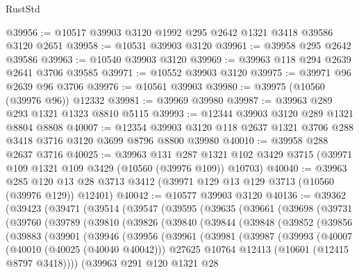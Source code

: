 \begin{lexlean}{RustStd}
\begin{coremodule}
@39956 := @10517 @39903 @3120 @1992 @295 @2642 @1321 @3418 @39586 @3120 @2651
@39958 := @10531 @39903 @3120
@39961 := @39958 @295 @2642 @39586
@39963 := @10540 @39903 @3120
@39969 := @39963 @118 @294 @2639 @2641 @3706 @39585
@39971 := @10552 @39903 @3120
@39975 := @39971 @96 @2639 @96 @3706
@39976 := @10561 @39903
@39980 := @39975 (@10560 (@39976 @96)) @12332
@39981 := @39969 @39980
@39987 := @39963 @289 @293 @1321 @1323 @8810 @5115
@39993 := @12344 @39903 @3120 @289 @1321 @8804 @8808
@40007 := @12354 @39903 @3120 @118 @2637 @1321 @3706 @288 @3418 @3716 @3120 @3699 @8796 @8800 @39980
@40010 := @39958 @288 @2637 @3716
@40025 := @39963
    @131
    @287
    @1321
    @102
    @3429
    @3715
    (@39971 @109 @1321 @109 @3429 (@10560 (@39976 @109)) @10703)
@40040 := @39963
    @285
    @120
    @13
    @28
    @3713
    @3412
    (@39971 @129 @13 @129 @3713 (@10560 (@39976 @129)) @12401)
@40042 := @10577 @39903 @3120
@40136 := @39362
    (@39423
      (@39471
        (@39514
          (@39547
            (@39595
              (@39635
                (@39661
                  (@39698
                    (@39731
                      (@39760
                        (@39789
                          (@39810
                            (@39826
                              (@39840
                                (@39844
                                  (@39848
                                    (@39852
                                      (@39856
                                        (@39883
                                          (@39901
                                            (@39946
                                              (@39956
                                                (@39961
                                                  (@39981
                                                    (@39987
                                                      (@39993
                                                        (@40007
                                                          (@40010 (@40025 (@40040 @40042)))
                                                          @27625
                                                          @10764
                                                          @12413
                                                          (@10601 (@12415 @8797 @3418))))
                                                      (@39963
                                                        @291
                                                        @120
                                                        @1321
                                                        @28

\end{coremodule}
\end{lexlean}
